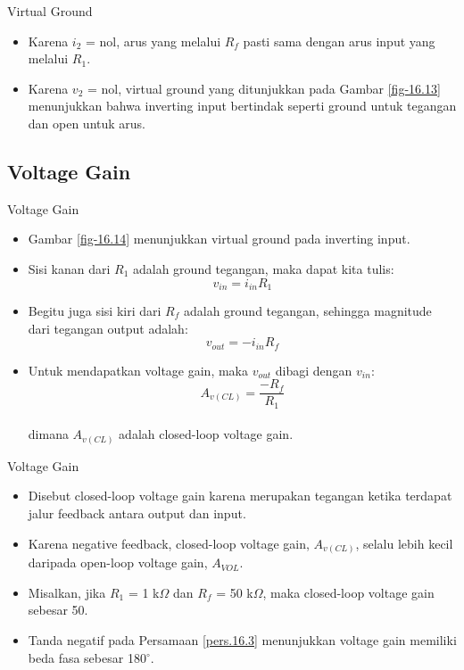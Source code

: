 \begin{frame}{Virtual Ground}
	\begin{itemize}
		\item Karena $ i_2 $ = nol, arus yang melalui $ R_f $ pasti sama dengan arus input yang melalui $ R_1 $.
		\item Karena $ v_2 $ = nol, virtual ground yang ditunjukkan pada Gambar \ref{fig-16.13} menunjukkan bahwa inverting input bertindak seperti ground untuk tegangan dan open untuk arus.
	\end{itemize}
\end{frame}

\subsection{Voltage Gain}

\begin{frame}{Voltage Gain}
	\begin{itemize}
		\item Gambar \ref{fig-16.14} menunjukkan virtual ground pada inverting input.
		\item Sisi kanan dari $ R_1 $ adalah ground tegangan, maka dapat kita tulis:\\
		$$ v_{in} = i_{in} R_1 $$
		\item Begitu juga sisi kiri dari $ R_f $ adalah ground tegangan, sehingga magnitude dari tegangan output adalah:\\
		$$ v_{out} = -i_{in} R_f $$
		\item Untuk mendapatkan voltage gain, maka $ v_{out} $ dibagi dengan $ v_{in} $:
		\begin{equation}\label{pers.16.3}
			A_{v(CL)} = \frac{-R_f}{R_1}
		\end{equation}\\
		dimana $ A_{v(CL)} $ adalah closed-loop voltage gain.
	\end{itemize}
\end{frame}

\begin{frame}{Voltage Gain}
	\begin{itemize}
		\item Disebut closed-loop voltage gain karena merupakan tegangan ketika terdapat jalur feedback antara output dan input.
		\item Karena negative feedback, closed-loop voltage gain, $ A_{v(CL)} $, selalu lebih kecil daripada open-loop voltage gain, $ A_{VOL} $.
		\item Misalkan, jika $ R_1 $ = 1 k$\Omega$ dan $ R_f $ = 50 k$\Omega$, maka closed-loop voltage gain sebesar 50.
		\item Tanda negatif pada Persamaan \ref{pers.16.3} menunjukkan voltage gain memiliki beda fasa sebesar 180$ ^\circ $.
	\end{itemize}
\end{frame}

